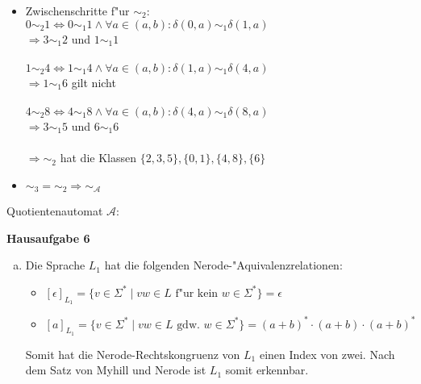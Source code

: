 \documentclass[a4paper,12pt]{article}
\newcommand{\Aufgabe}[1]{
        {
        \vspace*{0.5cm}
        \textbf{Hausaufgabe #1}
        \vspace*{0.2cm}
    }
}
\begin{document}
\begin{itemize}
        \item Zwischenschritte f"ur $ \sim_2 $: \\
        $ 0 \sim_2 1 \Leftrightarrow 0 \sim_1 1 \land \forall a \in (a, b): \delta(0, a) \sim_1 \delta(1, a) $ \\
        $ \Rightarrow 3 \sim_1 2 $ und  $ 1 \sim_1 1 $ \\ \\

        $ 1 \sim_2 4 \Leftrightarrow 1 \sim_1 4 \land \forall a \in (a, b): \delta(1, a) \sim_1 \delta(4, a) $ \\
        $ \Rightarrow 1 \sim_1 6 $ gilt nicht \\ \\

        $ 4 \sim_2 8 \Leftrightarrow 4 \sim_1 8 \land \forall a \in (a, b): \delta(4, a) \sim_1 \delta(8, a) $ \\
        $ \Rightarrow 3 \sim_1 5 $ und  $ 6 \sim_1 6 $ \\ \\

        $ \Rightarrow \sim_2 $ hat die Klassen $ \{2, 3, 5\}, \{0, 1\}, \{4, 8\}, \{6\} $

        \item $ \sim_3 = \sim_2 \Rightarrow \sim_{\mathcal{A}} $
    \end{itemize}

    Quotientenautomat $ \mathcal{A} $:

    \Aufgabe{6}
    \begin{enumerate}[(a)]
        \item
        Die Sprache $ L_1 $ hat die folgenden Nerode-"Aquivalenzrelationen: \\
        \begin{itemize}
            \item $ [\epsilon]_{L_1} = \{v \in \Sigma^* \; | \; vw \in L \text{ f"ur kein } w \in \Sigma^*\} = \epsilon $
            \item $ [a]_{L_1} = \{v \in \Sigma^* \; | \; vw \in L \text{ gdw. } w \in \Sigma^*\} = (a + b)^* \cdot (a + b) \cdot (a + b)^* $
        \end{itemize}
        Somit hat die Nerode-Rechtskongruenz von $ L_1 $ einen Index von zwei.
        Nach dem Satz von Myhill und Nerode ist $ L_1 $ somit erkennbar.

    \end{enumerate}
\end{document}
